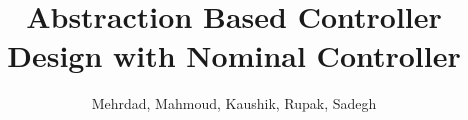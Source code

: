 \documentclass{llncs}
\title{Abstraction Based Controller Design with Nominal Controller}
\author{Mehrdad, Mahmoud, Kaushik, Rupak, Sadegh}
\begin{document}
\maketitle

\begin{abstract}
	
\end{abstract}



	 





\end{document}
